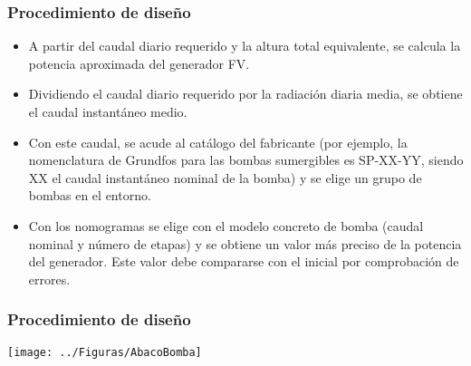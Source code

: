 \documentclass[serif, xcolor=dvipsnames]{beamer}
\begin{document}
\begin{frame}
\frametitle{Procedimiento de diseño}
\begin{itemize}
\item A partir del caudal diario requerido y la altura total equivalente,
se calcula la potencia aproximada del generador FV.
\item Dividiendo el caudal diario requerido por la radiación diaria media,
se obtiene el caudal instantáneo medio. 
\item Con este caudal, se acude al catálogo del fabricante (por ejemplo,
la nomenclatura de Grundfos para las bombas sumergibles es SP-XX-YY,
siendo XX el caudal instantáneo nominal de la bomba) y se elige un
grupo de bombas en el entorno.
\item Con los nomogramas se elige con el modelo concreto de bomba (caudal
nominal y número de etapas) y se obtiene un valor más preciso de la
potencia del generador. Este valor debe compararse con el inicial
por comprobación de errores.
\end{itemize}

\end{frame}

\begin{frame}[plain]
\frametitle{Procedimiento de diseño}

\begin{center}
\texttt{[image: ../Figuras/AbacoBomba]}
\par\end{center}

\end{frame}
\end{document}
